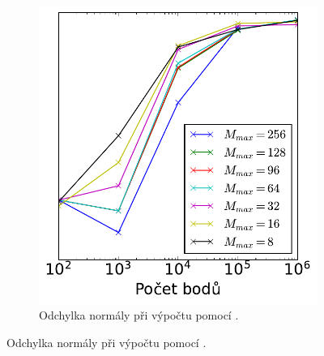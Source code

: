 \begin{figure}
\begin{subfigure}[t]{0.49\columnwidth}
\end{subfigure}
\hfill
\begin{subfigure}[t]{0.49\columnwidth}
    \centering  
    \includegraphics[scale=0.6]{obrazky-figures/benchmark/accuracy/normal/acccurucy_leaf_err_normal.pdf}
    \caption{Odchylka normály při výpočtu pomocí .}


\end{subfigure}
\end{figure}

